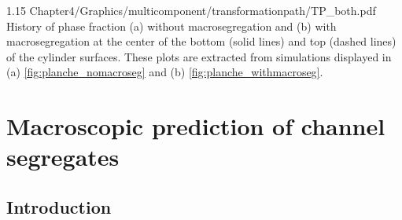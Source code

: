 

\begin{landscape}
\begin{figureth}
{1.15}
{Chapter4/Graphics/multicomponent/transformationpath/TP_both.pdf}
{History of phase fraction (a) without macrosegregation and (b) with 
macrosegregation at the center of the bottom (solid lines) and top (dashed lines) 
of the cylinder surfaces.
These plots are extracted from simulations displayed in (a) \cref{fig:planche_nomacroseg}
and (b) \cref{fig:planche_withmacroseg}.}
\label{fig:tp_macroseg_influence}
\end{figureth}
\end{landscape}


\section{Macroscopic prediction of channel segregates}

\subsection{Introduction}  \label{sec:intro_freckle}

